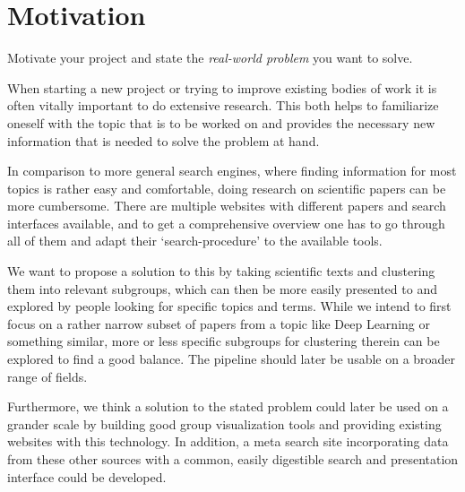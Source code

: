 \section{Motivation}

Motivate your project and state the \textit{real-world problem} you want to solve.

When starting a new project or trying to improve existing bodies of work it is often vitally important to do extensive research.
This both helps to familiarize oneself with the topic that is to be worked on and provides the necessary new information that is needed to solve the problem at hand.

In comparison to more general search engines, where finding information for most topics is rather easy and comfortable, doing research on scientific papers can be more cumbersome.
There are multiple websites with different papers and search interfaces available, and to get a comprehensive overview one has to go through all of them and adapt their `search-procedure' to the available tools.

We want to propose a solution to this by taking scientific texts and clustering them into relevant subgroups, which can then be more easily presented to and explored by people looking for specific topics and terms.
While we intend to first focus on a rather narrow subset of papers from a topic like Deep Learning or something similar, more or less specific subgroups for clustering therein can be explored to find a good balance.
The pipeline should later be usable on a broader range of fields.

Furthermore, we think a solution to the stated problem could later be used on a grander scale by building good group visualization tools and providing existing websites with this technology.
In addition, a meta search site incorporating data from these other sources with a common, easily digestible search and presentation interface could be developed.